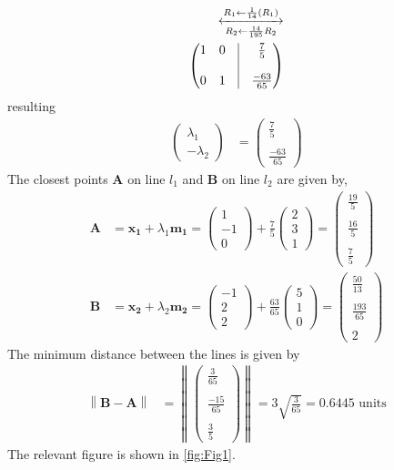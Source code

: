 \documentclass[12pt]{article}
\providecommand{\brak}[1]{\ensuremath{\left(#1\right)}}
\providecommand{\norm}[1]{\left\lVert#1\right\rVert}
\newcommand{\myvec}[1]{\ensuremath{\begin{pmatrix}#1\end{pmatrix}}}
\let\vec\mathbf
\begin{document}
\begin{enumerate}
\begin{align}
	\xleftrightarrow[R_2 \leftarrow \frac{14}{195}R_2]{R_1 \leftarrow \frac{1}{14} \brak{R_1}}\\
	\myvec{1&0&\vrule&\frac{7}{5}\\&&\vrule\\0&1&\vrule&\frac{-63}{65}}
\end{align}
resulting
\begin{align}
 	\myvec{\lambda_1\\-\lambda_2} &= \myvec{\frac{7}{5}\\\\\frac{-63}{65}}
\end{align}
The closest points $\vec{A}$ on line $l_1$ and $\vec{B}$ on line $l_2$ are given by,
\begin{align}
	\vec{A} &= \vec{x_1} + \lambda_1\vec{m_1}
	= \myvec{1\\-1\\0} + \frac{7}{5}\myvec{2\\3\\1} = \myvec{\frac{19}{5}\\ \\ \frac{16}{5}\\ \\ \frac{7}{5}}\\
	\vec{B} &= \vec{x_2} + \lambda_2\vec{m_2}
	= \myvec{-1\\2\\2} + \frac{63}{65}\myvec{5\\1\\0} = \myvec{\frac{50}{13}\\ \\ \frac{193}{65}\\ \\ 2} 
\end{align}
The minimum distance between the lines is given by
\begin{align}
	\norm{\vec{B}-\vec{A}} &= \norm{\myvec{\frac{3}{65}\\\\\frac{-15}{65}\\\\\frac{3}{5}}}
	= 3\sqrt{\frac{3}{65}} = 0.6445 \text{ units}
\end{align}
The relevant figure is shown in \ref{fig:Fig1}. 
\begin{figure}[!h]
	\begin{center}

\end{center}
\end{figure}
\end{enumerate}
\end{document}
